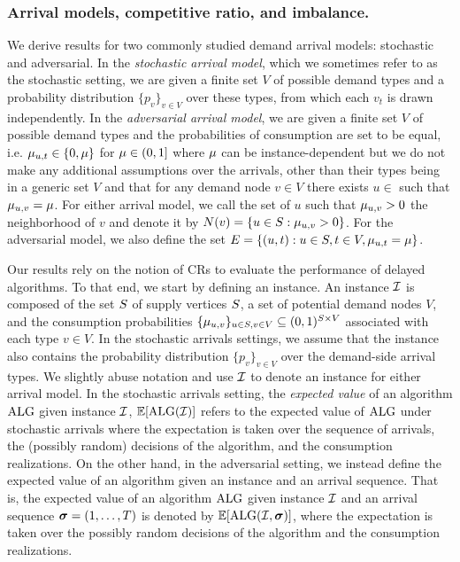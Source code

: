 \subsubsection*{Arrival models,  competitive ratio, and imbalance.}
We derive results for two commonly studied demand arrival models: stochastic and adversarial. In the \textit{stochastic arrival model}, which we sometimes refer to as the stochastic setting, we are given a finite set $V$ of possible demand types and a probability distribution $\{p_{v}\}_{v \in V}$ over these types, from which each $v_t$ is drawn independently.  In the \textit{adversarial arrival model}, we are given a finite set $V$ of possible demand types and the probabilities of consumption are set to be equal, i.e. $\mu_{u,t} \in \{ 0, \mu\}$ for $\mu \in (0,1]$ where $\mu$ can be instance-dependent but we do not make any additional assumptions over the arrivals, other than their types being in a generic set $V$ and that for any demand node $v\in V$ there exists $u\in $ such that $\mu_{u,v}=\mu$. For either arrival model, we call the set of $u$ such that $\mu_{u,v}>0$ the neighborhood of $v$ and denote it by  $N(v) = \{u \in S : \mu_{u,v} > 0 \}$. For the adversarial model, we also define the set $E=\{(u,t): u\in S, t\in V, \mu_{u,t}=\mu\}$.

Our results rely on the notion of CRs to evaluate the performance of delayed algorithms. To that end, we start by defining an instance. An instance $\mathcal I$ is composed of the set $S$ of supply vertices $S$, a set of potential demand nodes $V$, and the consumption probabilities $\{ \mu_{u,v}\}_{u \in S, v \in V} \subseteq (0,1)^{S \times V}$ associated with each type $v \in V$.  In the stochastic arrivals settings, we assume that the instance also contains the probability distribution $\{p_v\}_{v \in V}$ over the demand-side arrival types. We slightly abuse notation and use $\mathcal I$ to denote an instance for either arrival model.  
In the stochastic arrivals setting, the \textit{expected value} of an algorithm $\mathrm{ALG}$ given instance $\mathcal I$, $\mathbb{E}[\mathrm{ALG}(\mathcal I)]$ refers to the expected value of $\mathrm{ALG}$ under stochastic arrivals where the expectation is taken over the sequence of arrivals, the (possibly random) decisions of the algorithm, and the consumption realizations. On the other hand,  in the adversarial setting, we instead define the expected value of an algorithm given an instance and an arrival sequence. That is, the expected value of an algorithm $\mathrm{ALG}$ given instance $\mathcal I$ and an arrival sequence  {$\bm{\sigma}=(1, \ldots, T)$} is denoted by $\mathbb{E}[\mathrm{ALG}(\mathcal I, \bm{\sigma})]$, where the expectation is taken over the possibly random decisions of the algorithm and the consumption realizations. 


